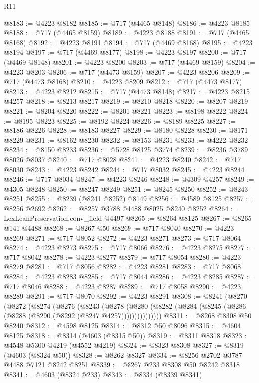 \begin{lexlean}{R11}
\begin{coremodule}
@8183 := @4223 @8182
@8185 := @717 (@4465 @8148)
@8186 := @4223 @8185
@8188 := @717 (@4465 @8159)
@8189 := @4223 @8188
@8191 := @717 (@4465 @8168)
@8192 := @4223 @8191
@8194 := @717 (@4469 @8168)
@8195 := @4223 @8194
@8197 := @717 (@4469 @8177)
@8198 := @4223 @8197
@8200 := @717 (@4469 @8148)
@8201 := @4223 @8200
@8203 := @717 (@4469 @8159)
@8204 := @4223 @8203
@8206 := @717 (@4473 @8159)
@8207 := @4223 @8206
@8209 := @717 (@4473 @8168)
@8210 := @4223 @8209
@8212 := @717 (@4473 @8177)
@8213 := @4223 @8212
@8215 := @717 (@4473 @8148)
@8217 := @4223 @8215 @4257
@8218 := @8213 @8217
@8219 := @8210 @8218
@8220 := @8207 @8219
@8221 := @8204 @8220
@8222 := @8201 @8221
@8223 := @8198 @8222
@8224 := @8195 @8223
@8225 := @8192 @8224
@8226 := @8189 @8225
@8227 := @8186 @8226
@8228 := @8183 @8227
@8229 := @8180 @8228
@8230 := @8171 @8229
@8231 := @8162 @8230
@8232 := @8153 @8231
@8233 := @4222 @8232
@8234 := @8150 @8233
@8236 := @5728 @8125 @3774
@8239 := @8236 @3789 @8026 @8037
@8240 := @717 @8028
@8241 := @4223 @8240
@8242 := @717 @8030
@8243 := @4223 @8242
@8244 := @717 @8032
@8245 := @4223 @8244
@8246 := @717 @8034
@8247 := @4223 @8246
@8248 := @4309 @4257
@8249 := @4305 @8248
@8250 := @8247 @8249
@8251 := @8245 @8250
@8252 := @8243 @8251
@8255 := @8239 (@8241 @8252) @8149
@8256 := @4589 @8125
@8257 := @8256 @2692
@8262 := @8257 @3788 @4488 @8025 @8240 @8252
@8264 := LexLeanPreservation.conv_field @4497
@8265 := @8264 @8125
@8267 := @8265 @141 @4488
@8268 := @8267 @50
@8269 := @717 @8040
@8270 := @4223 @8269
@8271 := @717 @8052
@8272 := @4223 @8271
@8273 := @717 @8064
@8274 := @4223 @8273
@8275 := @717 @8066
@8276 := @4223 @8275
@8277 := @717 @8042
@8278 := @4223 @8277
@8279 := @717 @8054
@8280 := @4223 @8279
@8281 := @717 @8056
@8282 := @4223 @8281
@8283 := @717 @8068
@8284 := @4223 @8283
@8285 := @717 @8044
@8286 := @4223 @8285
@8287 := @717 @8046
@8288 := @4223 @8287
@8289 := @717 @8058
@8290 := @4223 @8289
@8291 := @717 @8070
@8292 := @4223 @8291
@8308 := @8241
    (@8270
      (@8272
        (@8274
          (@8276
            (@8243
              (@8278
                (@8280 (@8282 (@8284 (@8245 (@8286 (@8288 (@8290 (@8292 (@8247 @4257)))))))))))))))
@8311 := @8268 @8308 @50 @8240
@8312 := @4598 @8125
@8314 := @8312 @50 @8096
@8315 := @4604 @8125
@8318 := @8314 (@4603 (@8315 @50))
@8319 := @8311 @8318
@8323 := @4548 @5300 @4219 (@4552 @4219)
@8324 := @8323 @8308
@8327 := @8319 (@4603 (@8324 @50))
@8328 := @8262 @8327
@8334 := @8256 @2702 @3787 @4488 @7121 @8242 @8251
@8339 := @8267 @233 @8308 @50 @8242 @8318
@8341 := @4603 (@8324 @233)
@8343 := @8334 (@8339 @8341)

\end{coremodule}
\end{lexlean}
